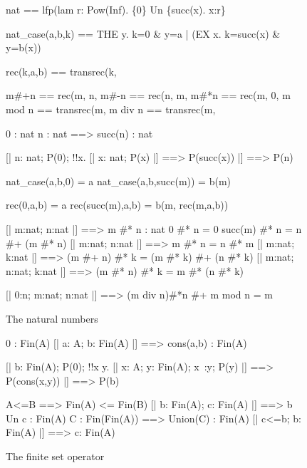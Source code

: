 \begin{figure}
\begin{ttbox}
       nat == lfp(lam r: Pow(Inf). \{0\} Un \{succ(x). x:r\}

  nat_case(a,b,k) == 
              THE y. k=0 & y=a | (EX x. k=succ(x) & y=b(x))

       rec(k,a,b) ==  
              transrec(k, %

       m#+n == rec(m, n, %
      m#-n == rec(n, m, %
      m#*n == rec(m, 0, %
       m mod n == transrec(m, %
       m div n == transrec(m, %

        0 : nat
     n : nat ==> succ(n) : nat

    [| n: nat;  P(0);  !!x. [| x: nat;  P(x) |] ==> P(succ(x)) 
    |] ==> P(n)

    nat_case(a,b,0) = a
 nat_case(a,b,succ(m)) = b(m)

         rec(0,a,b) = a
      rec(succ(m),a,b) = b(m, rec(m,a,b))

     [| m:nat;  n:nat |] ==> m #* n : nat
        0 #* n = 0
     succ(m) #* n = n #+ (m #* n)
  [| m:nat;  n:nat |] ==> m #* n = n #* m
    [| m:nat;  k:nat |] ==> (m #+ n) #* k = (m #* k) #+ (n #* k)
    [| m:nat;  n:nat;  k:nat |] ==> (m #* n) #* k = m #* (n #* k)

    [| 0:n;  m:nat;  n:nat |] ==> (m div n)#*n #+ m mod n = m
\end{ttbox}
\caption{The natural numbers} \label{zf-nat}
\end{figure}

\begin{figure}
\begin{ttbox}
          0 : Fin(A)
       [| a: A;  b: Fin(A) |] ==> cons(a,b) : Fin(A)

    [| b: Fin(A);
       P(0);
       !!x y. [| x: A;  y: Fin(A);  x~:y;  P(y) |] ==> P(cons(x,y))
    |] ==> P(b)

        A<=B ==> Fin(A) <= Fin(B)
         [| b: Fin(A);  c: Fin(A) |] ==> b Un c : Fin(A)
      C : Fin(Fin(A)) ==> Union(C) : Fin(A)
      [| c<=b;  b: Fin(A) |] ==> c: Fin(A)
\end{ttbox}
\caption{The finite set operator} \label{zf-fin}
\end{figure}

